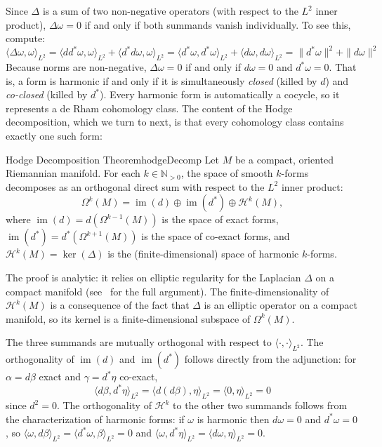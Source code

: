 \documentclass{article}
\newcommand{\N}{\mathbb{N}}
\newcommand{\CH}{\mathcal{H}}
\newcommand{\im}{\operatorname{im}}
\begin{document}
Since $\Delta$ is a sum of two non-negative operators (with respect to the
$L^2$ inner product), $\Delta\omega = 0$ if and only if both summands vanish
individually. To see this, compute:
\[
  \langle \Delta\omega, \omega \rangle_{L^2}
    = \langle dd^*\omega, \omega \rangle_{L^2}
      + \langle d^*d\omega, \omega \rangle_{L^2}
    = \langle d^*\omega, d^*\omega \rangle_{L^2}
      + \langle d\omega, d\omega \rangle_{L^2}
    = \|d^*\omega\|^2 + \|d\omega\|^2
\]
Because norms are non-negative, $\Delta\omega = 0$ if and only if
$d\omega = 0$ and $d^*\omega = 0$. That is, a form is harmonic if and only if
it is simultaneously \emph{closed} (killed by $d$) and \emph{co-closed}
(killed by $d^*$). Every harmonic form is automatically a cocycle, so it
represents a de Rham cohomology class. The content of the Hodge decomposition,
which we turn to next, is that every cohomology class contains exactly one such
form:

\begin{thm}{Hodge Decomposition Theorem}{hodgeDecomp}
  Let $M$ be a compact, oriented Riemannian manifold. For each $k \in \N_{>0}$, the space
  of smooth $k$-forms decomposes as an orthogonal direct sum with respect to
  the $L^2$ inner product:
  \[
    \Omega^k(M) = \im(d) \oplus \im(d^*) \oplus \CH^k(M),
  \]
  where $\im(d) = d(\Omega^{k-1}(M))$ is the space of exact forms,
  $\im(d^*) = d^*(\Omega^{k+1}(M))$ is the space of co-exact forms, and
  $\CH^k(M) = \ker(\Delta)$ is the (finite-dimensional) space of harmonic
  $k$-forms.
\end{thm}

The proof is analytic: it relies on elliptic regularity for the Laplacian
$\Delta$ on a compact manifold (see~\cite{NateHodge} for the full argument).
The finite-dimensionality of $\CH^k(M)$ is a consequence of the fact that
$\Delta$ is an elliptic operator on a compact manifold, so its kernel is a
finite-dimensional subspace of $\Omega^k(M)$.

The three summands are mutually orthogonal with respect to $\langle \cdot,
\cdot \rangle_{L^2}$. The orthogonality of $\im(d)$ and $\im(d^*)$ follows
directly from the adjunction: for $\alpha = d\beta$ exact and $\gamma =
d^*\eta$ co-exact,
\[
  \langle d\beta, d^*\eta \rangle_{L^2}
    = \langle d(d\beta), \eta \rangle_{L^2}
    = \langle 0, \eta \rangle_{L^2} = 0
\]
since $d^2 = 0$. The orthogonality of $\CH^k$ to the other two summands
follows from the characterization of harmonic forms: if $\omega$ is harmonic
then $d\omega = 0$ and $d^*\omega = 0$, so $\langle \omega, d\beta
\rangle_{L^2} = \langle d^*\omega, \beta \rangle_{L^2} = 0$ and
$\langle \omega, d^*\eta \rangle_{L^2} = \langle d\omega, \eta
\rangle_{L^2} = 0$.
\end{document}

